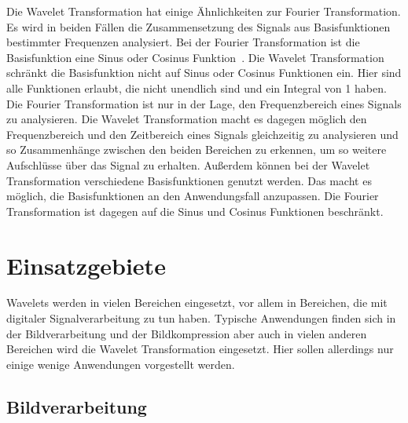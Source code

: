 \documentclass[12pt, a4paper, ngerman]{article}
\begin{document}
Die Wavelet Transformation hat einige Ähnlichkeiten zur Fourier Transformation.
Es wird in beiden Fällen die Zusammensetzung des Signals aus Basisfunktionen bestimmter Frequenzen analysiert.
Bei der Fourier Transformation ist die Basisfunktion eine Sinus oder Cosinus Funktion~\cite[S.5]{wavelets_intro}.
Die Wavelet Transformation schränkt die Basisfunktion nicht auf Sinus oder Cosinus Funktionen ein.
Hier sind alle Funktionen erlaubt, die nicht unendlich sind und ein Integral von 1 haben.
Die Fourier Transformation ist nur in der Lage, den Frequenzbereich eines Signals zu analysieren.
Die Wavelet Transformation macht es dagegen möglich den Frequenzbereich und den Zeitbereich eines Signals
gleichzeitig zu analysieren und so Zusammenhänge zwischen den beiden Bereichen zu erkennen,
um so weitere Aufschlüsse über das Signal zu erhalten.
Außerdem können bei der Wavelet Transformation verschiedene Basisfunktionen genutzt werden.
Das macht es möglich, die Basisfunktionen an den Anwendungsfall anzupassen.
Die Fourier Transformation ist dagegen auf die Sinus und Cosinus Funktionen beschränkt.

\section{Einsatzgebiete}

Wavelets werden in vielen Bereichen eingesetzt,
vor allem in Bereichen, die mit digitaler Signalverarbeitung zu tun haben.
Typische Anwendungen finden sich in der Bildverarbeitung und der Bildkompression
aber auch in vielen anderen Bereichen wird die Wavelet Transformation eingesetzt.
Hier sollen allerdings nur einige wenige Anwendungen vorgestellt werden.

\subsection{Bildverarbeitung}
\end{document}
